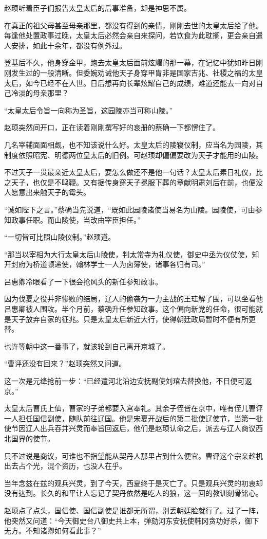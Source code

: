 赵顼听着臣子们报告太皇太后的后事准备，却是神思不属。

在真正的祖父母甚至母亲那里，都没有得到的亲情，刚刚去世的太皇太后给了他。每逢他处置政事过晚，太皇太后必然会亲自来探问，若饮食为此耽搁，更会亲自遣人安排，如此十余年，都没有例外过。

登基后不久，他身穿金甲，跑去太皇太后面前炫耀的那一幕，在记忆中犹如昨日刚刚发生过的一般清晰。但委婉劝诫他天子身穿甲胄非是国家吉兆、社稷之福的太皇太后，如今已经不在人世。日后想再向长辈炫耀自己的成绩，难道还能去一向对自己冷淡的母亲那里？

“太皇太后令旨一向称为圣旨，这园陵亦当可称山陵。”

赵顼突然间开口，正在读着刚刚撰写好的哀册的蔡确一下都愣住了。

几名宰辅面面相觑，也不知该说什么好。太皇太后的陵寝仪制，应当名为园陵，其制度依照昭宪、明德两位皇太后的旧例。可赵顼却偏偏要改为天子才能用的山陵。

不过天子一贯最亲近太皇太后，要怎么做还不是他一句话？太皇太后素日礼仪，比之天子，也仅是不鸣鞭。又有据传身穿天子冕服下葬的章献明肃刘后在前，也便没人愿意出来触天子的霉头。

“诚如陛下之言。”蔡确当先说道，“既如此园陵诸使当易名为山陵。园陵使，可由参知政事任职。而山陵使，当改由宰臣担任。”

“一切皆可比照山陵仪制。”赵顼道。

“那当以宰相为大行太皇太后山陵使，判太常寺为礼仪使，御史中丞为仪仗使，知开封府为桥道顿递使，翰林学士一人为卤簿使，诸事各归有司。”

吕惠卿冷眼看了一下很会抢风头的新任参知政事。

因为伐夏之役并非惨败的结局，辽人的偷袭为一力主战的王珪解了围，可以坐看他吕惠卿被人围攻。半个月前，蔡确升任参知政事。这个偏向新党的任命，很可能就是天子放弃自家的征兆。只是太皇太后新近大行，使得朝廷政局暂时不便有所更替。

也许等朝中这一番事了，就该轮到自己离开京城了。

“曹评还没有回来？”赵顼突然又问道。

这一次是元绛抢前一步：“已经遣河北沿边安抚副使刘琯去替换他，不日便可返京。”

太皇太后曹氏上仙，曹家的子弟都要入宫奉礼。其余子侄皆在京中，唯有侄儿曹评一人担任国信副使，随队前往辽国。他是宋夏开战后的第二批使辽使节，当第一批使节因辽人出兵吞并兴灵而奉旨回返后，他们是赵顼认命之后，派去与辽人商议西北国界的使节。

只不过说是商议，可谁也不指望能从契丹人那里占到什么便宜。曹评这个宗亲趁机出去占个光，混个资历，也没人在乎。

当年念兹在兹的观兵兴灵，到了今天，西夏终于是灭亡了。只是观兵兴灵的初衷却没有达到。长久的和平让人忘记了契丹依然是吃人的狼，这一回的教训刻骨铭心。

赵顼点了点头，国信使、国信副使是谁都无所谓，别丢朝廷脸就行了。过了一阵，他突然又问道：“今天御史台八御史共上本，弹劾河东安抚使韩冈贪功好杀，御下无方。不知诸卿如何看此事？”

